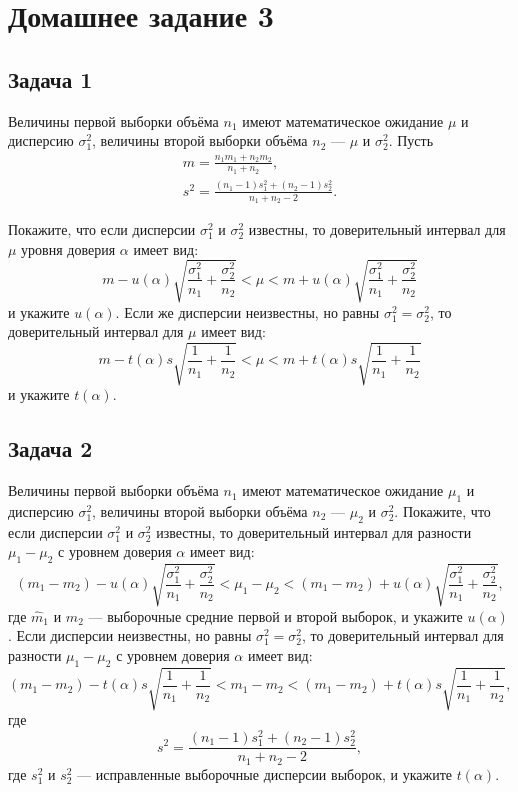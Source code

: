 \documentclass[a4paper,12pt]{article}
\begin{document}
\section*{Домашнее задание 3}

\subsection*{Задача 1 \cite[164]{Efimov}}

Величины первой выборки объёма $n_1$ имеют математическое ожидание $\mu$ и дисперсию $\sigma_1^2$, величины второй выборки объёма
$n_2$ --- $\mu$ и $\sigma_2^2$. Пусть
\begin{gather*}
    m = \frac{n_1 m_1 + n_2 m_2}{n_1 + n_2} , \\
    s^2 = \frac{(n_1 - 1) s_1^2 + (n_2 - 1) s_2^2}{n_1 + n_2 - 2} .
\end{gather*}

Покажите, что если дисперсии $\sigma_1^2$ и $\sigma_2^2$ известны, то доверительный интервал для $\mu$ уровня доверия $\alpha$ имеет вид:
\[
    m - u(\alpha) \sqrt{\frac{\sigma_1^2}{n_1} + \frac{\sigma_2^2}{n_2}}
    < \mu
    < m + u(\alpha) \sqrt{\frac{\sigma_1^2}{n_1} + \frac{\sigma_2^2}{n_2}}
\]
и укажите $u(\alpha)$. Если же дисперсии неизвестны, но равны $\sigma_1^2 = \sigma_2^2$, то доверительный интервал для $\mu$ имеет вид:
\[
    m - t(\alpha) s \sqrt{\frac{1}{n_1} + \frac{1}{n_2}}
    < \mu
    < m + t(\alpha) s \sqrt{\frac{1}{n_1} + \frac{1}{n_2}}
\]
и укажите $t(\alpha)$.

\subsection*{Задача 2 \cite[176, 177]{Efimov}}

Величины первой выборки объёма $n_1$ имеют математическое ожидание $\mu_1$ и дисперсию $\sigma_1^2$, величины второй выборки объёма
$n_2$ --- $\mu_2$ и $\sigma_2^2$. Покажите, что если дисперсии $\sigma_1^2$ и $\sigma_2^2$ известны, то доверительный интервал
для разности $\mu_1 - \mu_2$ с уровнем доверия $\alpha$ имеет вид:
\[
    (m_1 - m_2) - u(\alpha) \sqrt{\frac{\sigma_1^2}{n_1} + \frac{\sigma_2^2}{n_2}}
    < \mu_1 - \mu_2
    < (m_1 - m_2) + u(\alpha) \sqrt{\frac{\sigma_1^2}{n_1} + \frac{\sigma_2^2}{n_2}} ,
\]
где $\widehat{m}_1$ и $\widehat{m}_2$ --- выборочные средние первой и второй выборок, и укажите $u(\alpha)$. Если дисперсии
неизвестны, но равны $\sigma_1^2 = \sigma_2^2$, то доверительный интервал для разности $\mu_1 - \mu_2$ с уровнем доверия $\alpha$
имеет вид:
\[
    (m_1 - m_2) - t(\alpha) s \sqrt{\frac{1}{n_1} + \frac{1}{n_2}}
    < m_1 - m_2
    < (m_1 - m_2) + t(\alpha) s \sqrt{\frac{1}{n_1} + \frac{1}{n_2}} ,
\]
где
\[
    s^2 = \frac{(n_1 - 1) s_1^2 + (n_2 - 1) s_2^2}{n_1 + n_2 - 2} ,
\]
где $s_1^2$ и $s_2^2$ --- исправленные выборочные дисперсии выборок, и укажите $t(\alpha)$.
\end{document}
